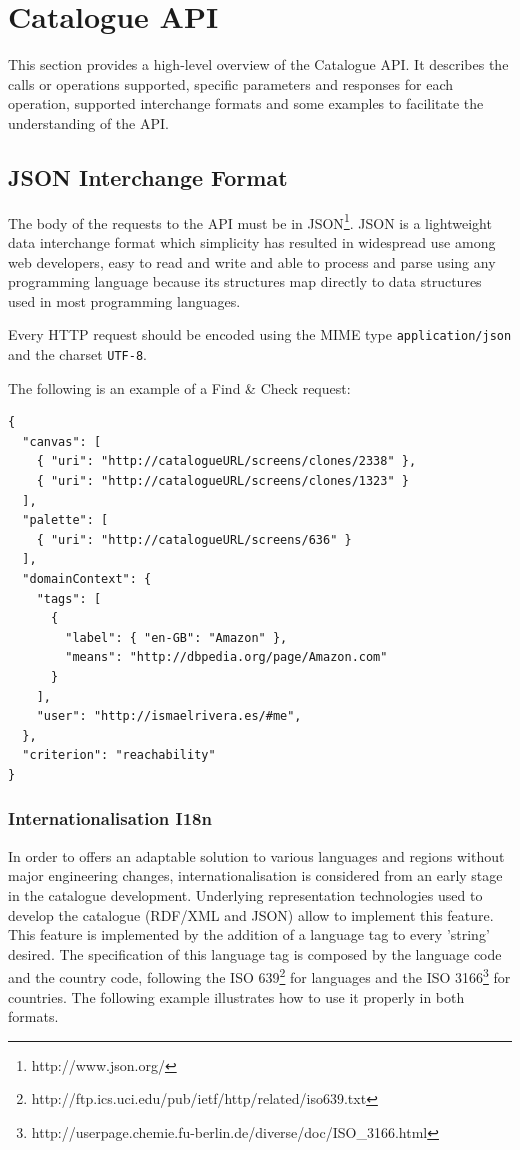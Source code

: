\documentclass{fast_latex}
\begin{document}


\clearpage
\section{Catalogue API} %
\label{sec:catalogue_api}

This section provides a high-level overview of the Catalogue API. It describes the calls or operations supported, specific parameters and responses for each operation, supported interchange formats and some examples to facilitate the understanding of the API.


\subsection{JSON Interchange Format} %
\label{sec:json_interchange_format}

The body of the requests to the API must be in JSON\footnote{http://www.json.org/}. JSON is a lightweight data interchange format which simplicity has resulted in widespread use among web developers, easy to read and write and able to process and parse using any programming language because its structures map directly to data structures used in most programming languages.

Every HTTP request should be encoded using the MIME type \texttt{application/json} and the charset \texttt{UTF-8}.

The following is an example of a Find \& Check request:

\singlespacing
\begin{verbatim}
{
  "canvas": [
    { "uri": "http://catalogueURL/screens/clones/2338" },
    { "uri": "http://catalogueURL/screens/clones/1323" }
  ],
  "palette": [
    { "uri": "http://catalogueURL/screens/636" }
  ],
  "domainContext": {
    "tags": [
      {
        "label": { "en-GB": "Amazon" },
        "means": "http://dbpedia.org/page/Amazon.com"
      }
    ],
    "user": "http://ismaelrivera.es/#me",
  },
  "criterion": "reachability"
}
\end{verbatim}
\doublespacing

\subsubsection{Internationalisation I18n} %

In order to offers an adaptable solution to various languages and regions without major engineering changes, internationalisation is considered from an early stage in the catalogue development. Underlying representation technologies used to develop the catalogue (RDF/XML and JSON) allow to implement this feature. This feature is implemented by the addition of a language tag to every 'string' desired. The specification of this language tag is composed by the language code and the country code, following the ISO 639\footnote{http://ftp.ics.uci.edu/pub/ietf/http/related/iso639.txt} for languages and the ISO 3166\footnote{http://userpage.chemie.fu-berlin.de/diverse/doc/ISO\_3166.html} for countries. The following example illustrates how to use it properly in both formats.
\end{document}
